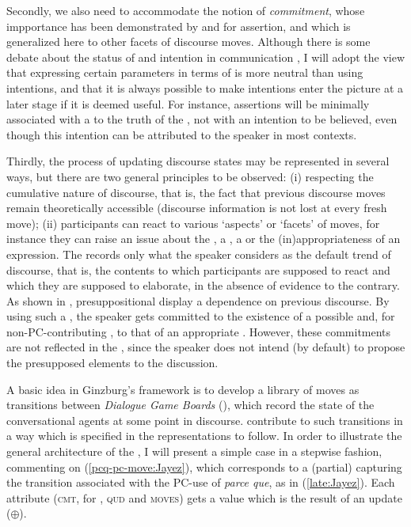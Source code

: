 \documentclass[output=paper,colorlinks,citecolor=brown]{langscibook}
\begin{document}
	Secondly, we also need to accommodate the notion of \textit{commitment}, whose impportance has been demonstrated by \citet{Krifka:2023} and \citet{MacFarlane:2011} for assertion, and which is generalized here to other facets of discourse moves. Although there is some debate about the status of  and intention in communication \citep{Geurts:2019,Harris:2019}, I will adopt the view that expressing certain parameters in terms of  is more neutral than using intentions, and that it is always possible to make intentions enter the picture at a later stage if it is deemed useful. For instance, assertions will be minimally associated with a  to the truth of the , not with an intention to be believed, even though this intention can be attributed to the speaker in most contexts.
	
	Thirdly, the process of updating discourse states may be represented in several ways, but there are two general principles to be observed: (i) respecting the cumulative nature of discourse, that is, the fact that previous discourse moves remain theoretically accessible (discourse information is not lost at every fresh move); (ii) participants can react to various `aspects' or `facets' of moves, for instance they can raise an issue about the , a , a  or the (in)appropriateness of an expression. The  records only what the speaker considers as the default trend of discourse, that is, the contents to which participants are supposed to react and which they are supposed to elaborate, in the absence of evidence to the contrary. As shown in , presuppositional  display a dependence on previous discourse. By using such a , the speaker gets committed to the existence of a possible  and, for non-PC-contributing , to that of an appropriate . However, these commitments are not reflected in the , since the speaker does not intend (by default) to propose the presupposed elements to the discussion.

A basic idea in Ginzburg's framework is to develop a library of moves as transitions between \textit{Dialogue Game Boards} (), which record the state of the conversational agents at some point in discourse.  contribute to such transitions in a way which is specified in the  representations to follow. In order to illustrate the general architecture of the , I will present a simple case in a stepwise fashion, commenting on (\ref{pcq-pc-move:Jayez}), which corresponds to a (partial)  capturing the transition associated with the PC-use of \textit{parce que}, as in (\ref{late:Jayez}). Each attribute (\textsc{cmt}, for , \textsc{qud} and \textsc{moves}) gets a value which is the result of an update ($\oplus$).
\end{document}
